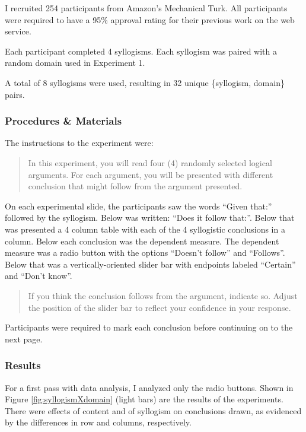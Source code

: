 \documentclass{llncs} %
\begin{document}
I recruited 254 participants from Amazon's Mechanical Turk. All participants were required to have a 95\% approval rating for their previous work on the web service. 

Each participant completed 4 syllogisms. Each syllogism was paired with a random domain used in Experiment 1.

A total of 8 syllogisms were used, resulting in 32 unique \{syllogism, domain\} pairs.

\subsubsection{Procedures \& Materials}

The instructions to the experiment were:

\begin{quotation}
In this experiment, you will read four (4) randomly selected logical arguments. For each argument, you will be presented with different conclusion that might follow from the argument presented.
\end{quotation}

On each experimental slide, the participants saw the words ``Given that:'' followed by the syllogism. Below was written: ``Does it follow that:''. Below that was presented a 4 column table with each of the 4 syllogistic conclusions in a column. Below each conclusion was the dependent measure. The dependent measure was a radio button with the options ``Doesn't follow'' and ``Follows''. Below that was a vertically-oriented slider bar with endpoints labeled ``Certain'' and ``Don't know''. 

\begin{quotation}
If you think the conclusion follows from the argument, indicate so. Adjust the position of the slider bar to reflect your confidence in your response.
\end{quotation}

Participants were required to mark each conclusion before continuing on to the next page.

\subsubsection{Results}

For a first pass with data analysis, I analyzed only the radio buttons. Shown in Figure \ref{fig:syllogismXdomain} (light bars) are the results of the experiments. There were effects of content and of syllogism on conclusions drawn, as evidenced by the differences in row and columns, respectively.
\end{document}
